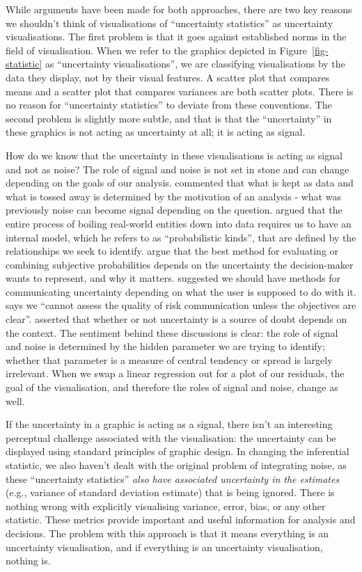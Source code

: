 \documentclass[]{ar-1col-S2O}
\begin{document}
While arguments have been made for both approaches, there are two key
reasons we shouldn't think of visualisations of ``uncertainty
statistics'' as uncertainty visualisations. The first problem is that it
goes against established norms in the field of visualisation. When we
refer to the graphics depicted in Figure~\ref{fig-statistic} as
``uncertainty visualisations'', we are classifying visualisations by the
data they display, not by their visual features. A scatter plot that
compares means and a scatter plot that compares variances are both
scatter plots. There is no reason for ``uncertainty statistics'' to
deviate from these conventions. The second problem is slightly more
subtle, and that is that the ``uncertainty'' in these graphics is not
acting as uncertainty at all; it is acting as signal.

How do we know that the uncertainty in these visualisations is acting as
signal and not as noise? The role of signal and noise is not set in
stone and can change depending on the goals of our analysis.
\citet{Meng2014} commented that what is kept as data and what is tossed
away is determined by the motivation of an analysis - what was
previously noise can become signal depending on the question.
\citet{Otsuka2023} argued that the entire process of boiling real-world
entities down into data requires us to have an internal model, which he
refers to as ``probabilistic kinds'', that are defined by the
relationships we seek to identify. \citet{Wallsten1997} argue that the
best method for evaluating or combining subjective probabilities depends
on the uncertainty the decision-maker wants to represent, and why it
matters. \citet{Fischhoff2014} suggested we should have methods for
communicating uncertainty depending on what the user is supposed to do
with it. \citet{Spiegelhalter2017} says we ``cannot assess the quality
of risk communication unless the objectives are clear''.
\citet{geointerviews} asserted that whether or not uncertainty is a
source of doubt depends on the context. The sentiment behind these
discussions is clear: the role of signal and noise is determined by the
hidden parameter we are trying to identify; whether that parameter is a
measure of central tendency or spread is largely irrelevant. When we
swap a linear regression out for a plot of our residuals, the goal of
the visualisation, and therefore the roles of signal and noise, change
as well.

If the uncertainty in a graphic is acting as a signal, there isn't an
interesting perceptual challenge associated with the visualisation: the
uncertainty can be displayed using standard principles of graphic
design. In changing the inferential statistic, we also haven't dealt
with the original problem of integrating noise, as these ``uncertainty
statistics'' \emph{also have associated uncertainty in the estimates}
(e.g., variance of standard deviation estimate) that is being ignored.
There is nothing wrong with explicitly visualising variance, error,
bias, or any other statistic. These metrics provide important and useful
information for analysis and decisions. The problem with this approach
is that it means everything is an uncertainty visualisation, and if
everything is an uncertainty visualisation, nothing is.
\end{document}
